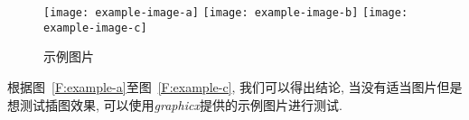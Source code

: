 \documentclass{ctexart}
\begin{document}
\begin{figure}[H]
    \centering
        {\texttt{[image: example-image-a]}}
        {\texttt{[image: example-image-b]}}
        {\texttt{[image: example-image-c]}}
    \caption{示例图片}\label{F:example}
\end{figure}
根据图~\ref{F:example-a}至图~\ref{F:example-c}, 我们可以得出结论, 当没有适当图片但是想测试插图效果, 可以使用\emph{graphicx}提供的示例图片进行测试.
\end{document}
